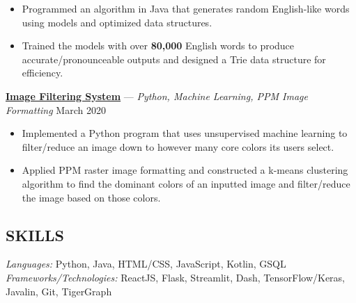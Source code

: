 \documentclass[11pt]{res}
\begin{document}
\begin{footnotesize}
\begin{resume}
\begin{itemize}[leftmargin=6.25mm] \itemsep -2pt 
\item Programmed an algorithm in Java that generates random English-like words using models and optimized data structures. 
\vspace{1mm}
\item Trained the models with over \textbf{80,000} English words to produce accurate/pronounceable outputs and designed a Trie data structure for efficiency.
\end{itemize}
\vspace{-2.5mm}
\href{https://github.com/CharlesShi12/ImageFilters}{\textbf{Image Filtering System}} — {\sl Python, Machine Learning, PPM Image Formatting} \hfill March 2020\vspace{-5mm}
\begin{itemize}[leftmargin=6.25mm] \itemsep -2pt 
\item Implemented a Python program that uses unsupervised machine learning to filter/reduce an image down to however many core colors its users select.
\vspace{1mm}
\item Applied PPM raster image formatting and constructed a k-means clustering algorithm to find the dominant colors of an inputted image and filter/reduce the image based on those colors. 
\end{itemize}
\begin{small}
\section{SKILLS}
\end{small} 
\vspace{.5mm}
{\sl Languages:} 
Python, Java, HTML/CSS, JavaScript, Kotlin, GSQL \\
{\sl Frameworks/Technologies:} ReactJS, Flask, Streamlit, Dash, TensorFlow/Keras, Javalin, Git, TigerGraph

\end{resume}
\end{footnotesize}
\end{document}
